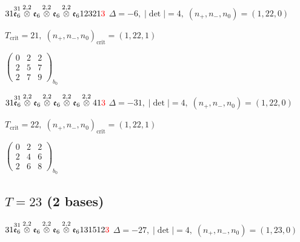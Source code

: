\documentclass[10pt]{article}
\begin{document}
\smallskip

$31\overset{31}{\mathfrak{e}_6}\overset{2,2}{\otimes}\mathfrak{e}_6\overset{2,2}{\otimes}\mathfrak{e}_6\overset{2,2}{\otimes}\mathfrak{e}_612321\textcolor{red}{3}$ \quad $\Delta=-6,\; |\det|=4,\; (n_+,n_-,n_0)=(1,22,0)$

\hspace{1em}$T_{\text{crit}}=21,\; (n_+,n_-,n_0)_{\text{crit}}=(1,22,1)$

\hspace{2em}$\left(\begin{smallmatrix}0 & 2 & 2 \\ 2 & 5 & 7 \\ 2 & 7 & 9\end{smallmatrix}\right)_{\!b_0}$

\smallskip

$31\overset{31}{\mathfrak{e}_6}\overset{2,2}{\otimes}\mathfrak{e}_6\overset{2,2}{\otimes}\mathfrak{e}_6\overset{2,2}{\otimes}\mathfrak{e}_6\overset{2,2}{\otimes}41\textcolor{red}{3}$ \quad $\Delta=-31,\; |\det|=4,\; (n_+,n_-,n_0)=(1,22,0)$

\hspace{1em}$T_{\text{crit}}=22,\; (n_+,n_-,n_0)_{\text{crit}}=(1,22,1)$

\hspace{2em}$\left(\begin{smallmatrix}0 & 2 & 2 \\ 2 & 4 & 6 \\ 2 & 6 & 8\end{smallmatrix}\right)_{\!b_0}$


\subsection*{$T = 23$ \quad (2 bases)}
\smallskip

$31\overset{31}{\mathfrak{e}_6}\overset{2,2}{\otimes}\mathfrak{e}_6\overset{2,2}{\otimes}\mathfrak{e}_6\overset{2,2}{\otimes}\mathfrak{e}_6131512\textcolor{red}{3}$ \quad $\Delta=-27,\; |\det|=4,\; (n_+,n_-,n_0)=(1,23,0)$
\end{document}
